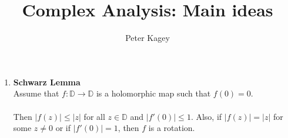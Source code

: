 \documentclass{article}
\begin{document}
\title{Complex Analysis: Main ideas}
\author{Peter Kagey}

\maketitle

\begin{enumerate}
  \item \textbf{Schwarz Lemma}\\
    Assume that $f\colon \mathbb{D} \rightarrow \mathbb{D}$ is a holomorphic map
    such that $f(0) = 0$.\\~\\
    Then $|f(z)| \leq |z|$ for all $z \in \mathbb{D}$ and $|f'(0)| \leq 1$. Also, if
    $|f(z)| = |z|$ for some $z \not= 0$ or if $|f'(0)| = 1$, then $f$ is a rotation.
\end{enumerate}
\end{document}
